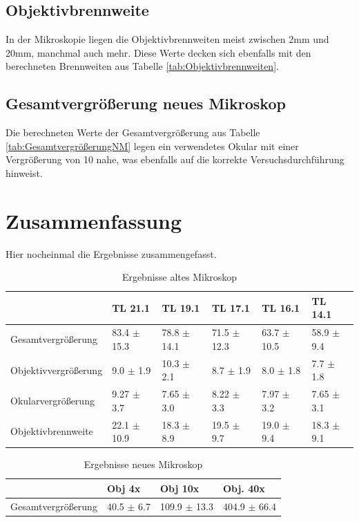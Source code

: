 \documentclass[12pt,a4paper,twoside]{article}
\begin{document}
\subsection{Objektivbrennweite}

In der Mikroskopie liegen die Objektivbrennweiten meist zwischen 2mm und 20mm, manchmal auch mehr. Diese Werte decken sich ebenfalls mit den berechneten Brennweiten aus Tabelle \ref{tab:Objektivbrennweiten}.


\subsection{Gesamtvergrößerung neues Mikroskop}

Die berechneten Werte der Gesamtvergrößerung aus Tabelle \ref{tab:GesamtvergrößerungNM} legen ein verwendetes Okular mit einer Vergrößerung von 10 nahe, was ebenfalls auf die korrekte Versuchsdurchführung hinweist.


\section{Zusammenfassung} %

Hier nocheinmal die Ergebnisse zusammengefasst.

\begin{table}[H]
    \centering
    \caption{Ergebnisse altes Mikroskop}
    \label{tab:ErgebnisseAM}
    \begin{tabular}{| l | l | l | l | l | l |}
        \hline
         & TL 21.1 & TL 19.1 & TL 17.1 & TL 16.1 & TL 14.1 \\
        \hline
        Gesamtvergrößerung & 83.4 $\pm$ 15.3 & 78.8 $\pm$ 14.1 & 71.5 $\pm$ 12.3 & 63.7 $\pm$ 10.5 & 58.9 $\pm$ 9.4 \\
        Objektivvergrößerung & 9.0 $\pm$ 1.9 & 10.3 $\pm$ 2.1 & 8.7 $\pm$ 1.9 & 8.0 $\pm$ 1.8 & 7.7 $\pm$ 1.8 \\
        Okularvergrößerung & 9.27 $\pm$ 3.7 & 7.65 $\pm$ 3.0 & 8.22 $\pm$ 3.3 & 7.97 $\pm$ 3.2 & 7.65 $\pm$ 3.1 \\
        Objektivbrennweite & 22.1 $\pm$ 10.9 & 18.3 $\pm$ 8.9 & 19.5 $\pm$ 9.7 & 19.0 $\pm$ 9.4 & 18.3 $\pm$ 9.1 \\
        \hline
    \end{tabular}
\end{table}

\begin{table}[H]
    \centering
    \caption{Ergebnisse neues Mikroskop}
    \label{tab:ErgebnisseNM}
    \begin{tabular}{| l | l | l | l |}
        \hline
         & Obj 4x & Obj 10x & Obj. 40x \\
        \hline
        Gesamtvergrößerung & 40.5 $\pm$ 6.7 & 109.9 $\pm$ 13.3 & 404.9 $\pm$ 66.4 \\
        \hline
    \end{tabular}
\end{table}
\end{document}
